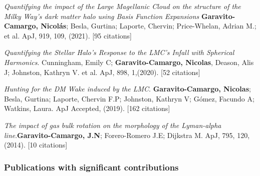 \documentclass[14pt]{article}
\begin{document}
\begin{etaremune}
\item \textit{Quantifying the impact of the Large Magellanic Cloud on the
  structure of the Milky Way’s dark matter halo using Basis Function Expansions} \textbf{Garavito-Camargo, Nicol\'as}; Besla, Gurtina; Laporte,
  Chervin; Price-Whelan, Adrian M.; et al. ApJ, 919, 109, (2021). [95 citations] 

\item \textit{Quantifying the Stellar Halo's Response to the LMC's Infall with
  Spherical Harmonics}. Cunningham, Emily C; \textbf{Garavito-Camargo, Nicolas}, Deason, Alis J;
  Johnston, Kathryn V. et al. ApJ, 898, 1,(2020). [52 citations]


\item \textit{Hunting for the DM Wake induced by the LMC}.
  \textbf{Garavito-Camargo, Nicolas}; Besla, Gurtina; Laporte, Chervin F.P;
  Johnston, Kathryn V; G\'omez, Facundo A; Watkins, Laura. ApJ Accepted, (2019).
  [162 citations]

 \item \textit{The impact of gas bulk rotation on the morphology of the
   Lyman-alpha line}.\textbf{Garavito-Camargo, J.N}; Forero-Romero J.E;
   Dijkstra M. ApJ, 795, 120, (2014). [10 citations]

\end{etaremune}


\subsubsection*{Publications with significant contributions}
\end{document}
